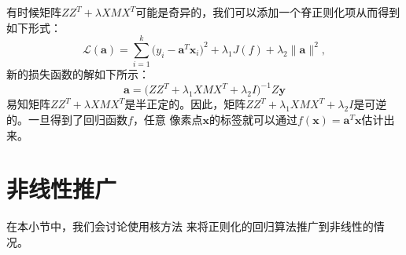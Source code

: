 有时候矩阵$ZZ^T+\lambda
XMX^T$可能是奇异的，我们可以添加一个脊正则化项\cite{statistical-leraning}从而得到如下形式：
\begin{equation}
\label{eqn:regularized-regression-linear}
    \mathcal{L}(\textbf{a})= \sum_{i=1}^k \big( y_i - \textbf{a}^T \textbf{x}_i \big)^2 +
    \lambda_1 J(f) + \lambda_2 \|\textbf{a}\|^2,
\end{equation}
新的损失函数的解如下所示：
\begin{equation}
\label{eqn:linear-sol} \mathbf{a}=\Big( ZZ^T + \lambda_1 XMX^T +
\lambda_2 I \Big)^{-1}Z\mathbf{y}
\end{equation}
易知矩阵$ZZ^T + \lambda XMX^T$是半正定的。因此，矩阵$ZZ^T +
\lambda_1 XMX^T + \lambda_2 I$是可逆的。一旦得到了回归函数$f$，任意
像素点$\mathbf{x}$的标签就可以通过$f(\mathbf{x}) = \mathbf{a}^T
\mathbf{x}$估计出来。

\section{非线性推广}
\label{sec:nonlinear-generalization}
在本小节中，我们会讨论使用核方法\cite{Learning-with-Kernels}
来将正则化的回归算法推广到非线性的情况。

